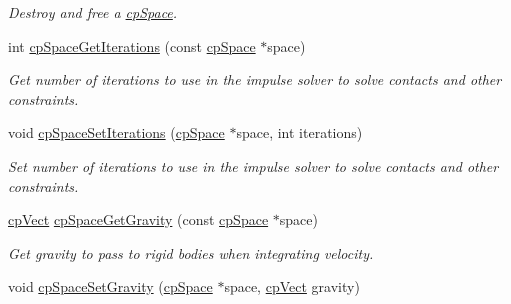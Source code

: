 \begin{DoxyCompactItemize}
\begin{DoxyCompactList}\small\item\em Destroy and free a \hyperlink{structcp_space}{cp\+Space}. \end{DoxyCompactList}\item 
\hypertarget{group__cp_space_ga60b3be9f6af76aed024a48389d72ab91}{}int \hyperlink{group__cp_space_ga60b3be9f6af76aed024a48389d72ab91}{cp\+Space\+Get\+Iterations} (const \hyperlink{structcp_space}{cp\+Space} $\ast$space)\label{group__cp_space_ga60b3be9f6af76aed024a48389d72ab91}

\begin{DoxyCompactList}\small\item\em Get number of iterations to use in the impulse solver to solve contacts and other constraints. \end{DoxyCompactList}\item 
\hypertarget{group__cp_space_gaa77e00fe5c3de55f24f70839cea71e26}{}void \hyperlink{group__cp_space_gaa77e00fe5c3de55f24f70839cea71e26}{cp\+Space\+Set\+Iterations} (\hyperlink{structcp_space}{cp\+Space} $\ast$space, int iterations)\label{group__cp_space_gaa77e00fe5c3de55f24f70839cea71e26}

\begin{DoxyCompactList}\small\item\em Set number of iterations to use in the impulse solver to solve contacts and other constraints. \end{DoxyCompactList}\item 
\hypertarget{group__cp_space_gadf6f7da6298ad15540f35c50cc23017d}{}\hyperlink{structcp_vect}{cp\+Vect} \hyperlink{group__cp_space_gadf6f7da6298ad15540f35c50cc23017d}{cp\+Space\+Get\+Gravity} (const \hyperlink{structcp_space}{cp\+Space} $\ast$space)\label{group__cp_space_gadf6f7da6298ad15540f35c50cc23017d}

\begin{DoxyCompactList}\small\item\em Get gravity to pass to rigid bodies when integrating velocity. \end{DoxyCompactList}\item 
\hypertarget{group__cp_space_ga37f6b61dc283b65af44efece7d3a8cdc}{}void \hyperlink{group__cp_space_ga37f6b61dc283b65af44efece7d3a8cdc}{cp\+Space\+Set\+Gravity} (\hyperlink{structcp_space}{cp\+Space} $\ast$space, \hyperlink{structcp_vect}{cp\+Vect} gravity)\label{group__cp_space_ga37f6b61dc283b65af44efece7d3a8cdc}


\end{DoxyCompactItemize}
